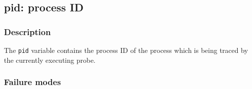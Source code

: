 \clearpage
{}
{}
\label{vars:pid}
\subsection*{pid: process ID}

\subsubsection*{Description}

The \verb|pid| variable contains the process ID of the process which
is being traced by the currently executing probe.

\subsubsection*{Failure modes}

